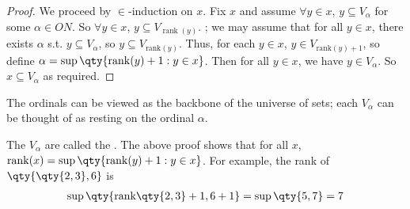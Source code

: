 \begin{proof}
    We proceed by $\in$-induction on $x$.
    Fix $x$ and assume $\forall y \in x$, $y \subseteq V_\alpha$ for some $\alpha \in ON$.
    So $\forall y \in x$, $y \subseteq V_{\operatorname{rank}(y)}$.
    ; we may assume that for all $y \in x$, there exists $\alpha$ s.t. $y \subseteq V_\alpha$, so $y \subseteq V_{\mathrm{rank}(y)}$.
    Thus, for each $y \in x$, $y \in V_{\mathrm{rank}(y)+1}$, so define $\alpha = \sup\qty{\mathrm{rank}(y) + 1 : y \in x}$.
    Then for all $y \in x$, we have $y \in V_\alpha$.
    So $x \subseteq V_\alpha$ as required.
\end{proof}
The ordinals can be viewed as the backbone of the universe of sets; each $V_\alpha$ can be thought of as resting on the ordinal $\alpha$.
\begin{remark}
    The $V_\alpha$ are called the .
    The above proof shows that for all $x$, $\mathrm{rank}(x) = \sup\qty{\mathrm{rank}(y) + 1 : y \in x}$.
    For example, the rank of $\qty{\qty{2, 3}, 6}$ is
    \begin{align*}
        \sup\qty{\mathrm{rank}\qty{2, 3} + 1, 6 + 1} = \sup\qty{5, 7} = 7
    \end{align*}
\end{remark}
